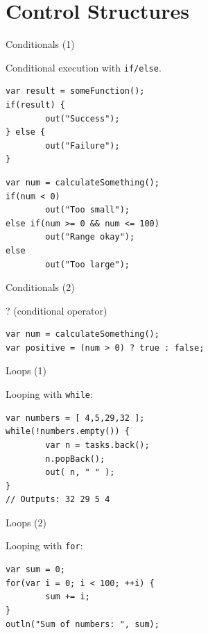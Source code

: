 \documentclass[ucs,9pt]{beamer}
\begin{document}
\section{Control Structures}
\begin{frame}[fragile]{Conditionals (1)}
	\begin{block}{Conditional execution with \lstinline!if/else!.}
		\begin{lstlisting}
var result = someFunction();
if(result) {
		out("Success");
} else {
		out("Failure");
}
		\end{lstlisting}
		\begin{lstlisting}
var num = calculateSomething();
if(num < 0) 
		out("Too small");
else if(num >= 0 && num <= 100)
		out("Range okay");
else
		out("Too large");
		\end{lstlisting}
	\end{block}
\end{frame}

\begin{frame}[fragile]{Conditionals (2)}
	\begin{block}{? (conditional operator)}
		\begin{lstlisting}
var num = calculateSomething();
var positive = (num > 0) ? true : false;
		\end{lstlisting}
	\end{block}
\end{frame}

\begin{frame}[fragile]{Loops (1)}
	\begin{block}{Looping with \lstinline!while!:}
		\begin{lstlisting}
var numbers = [ 4,5,29,32 ];
while(!numbers.empty()) {
		var n = tasks.back();
		n.popBack();
		out( n, " " );
}
// Outputs: 32 29 5 4
		\end{lstlisting}
	\end{block}
\end{frame}

\begin{frame}[fragile]{Loops (2)}
	\begin{block}{Looping with \lstinline!for!:}
		\begin{lstlisting}
var sum = 0;
for(var i = 0; i < 100; ++i) {
		sum += i;
}
outln("Sum of numbers: ", sum);
		\end{lstlisting}
	\end{block}
\end{frame}
\end{document}
